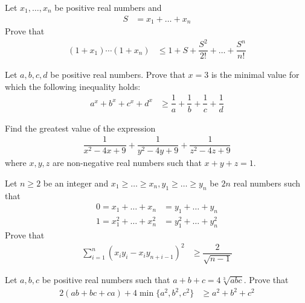 \documentclass{subfile}
\begin{document}
		\begin{problem}
			Let $x_{1},\ldots,x_{n}$ be positive real numbers and
				\begin{align*}
					S
						& = x_{1}+\ldots+x_{n}
				\end{align*}
			Prove that
				\begin{align*}
					(1+x_{1})\cdots(1+x_{n})
						& \leq 1+S+\dfrac{S^2}{2!}+\ldots+\dfrac{S^n}{n!}
				\end{align*}
		\end{problem}
	
		\begin{problem}
			Let $a,b,c,d$ be positive real numbers. Prove that $x=3$ is the minimal value for which the following inequality holds:
				\begin{align*}
					a^{x}+b^{x}+c^{x}+d^{x}
						& \geq\dfrac{1}{a}+\dfrac{1}{b}+\dfrac{1}{c}+\dfrac{1}{d}
				\end{align*}
		\end{problem}
	
		\begin{problem}
			Find the greatest value of the expression
				\begin{align*}
					\dfrac{1}{x^{2}-4x+9}+\dfrac{1}{y^{2}-4y+9}+\dfrac{1}{z^{2}-4z+9}
				\end{align*}
			where $x,y,z$ are non-negative real numbers such that $x+y+z=1$.
		\end{problem}
	
		\begin{problem}
			Let $n\geq2$ be an integer and $x_{1}\geq\ldots\geq x_{n},y_{1}\geq\ldots\geq y_{n}$ be $2n$ real numbers such that
				\begin{align*}
					0 = x_{1}+\ldots+x_{n}
						& = y_{1}+\ldots+y_{n}\\
					1 = x_{1}^{2}+\ldots+x_{n}^{2}
						& = y_{1}^{2}+\ldots+y_{n}^{2}
				\end{align*}
			Prove that
				\begin{align*}
					\sum_{i=1}^{n}(x_{i}y_{i}-x_{i}y_{n+i-1})^{2}
						& \geq\dfrac{2}{\sqrt{n-1}}
				\end{align*}
		\end{problem}
	
		\begin{problem}
			Let $a,b,c$ be positive real numbers such that $a+b+c=4\sqrt[3]{abc}$. Prove that
				\begin{align*}
					2(ab+bc+ca)+4\min\{a^{2},b^{2},c^{2}\}
						& \geq a^{2}+b^{2}+c^{2}
				\end{align*}
		\end{problem}
	
\end{document}
